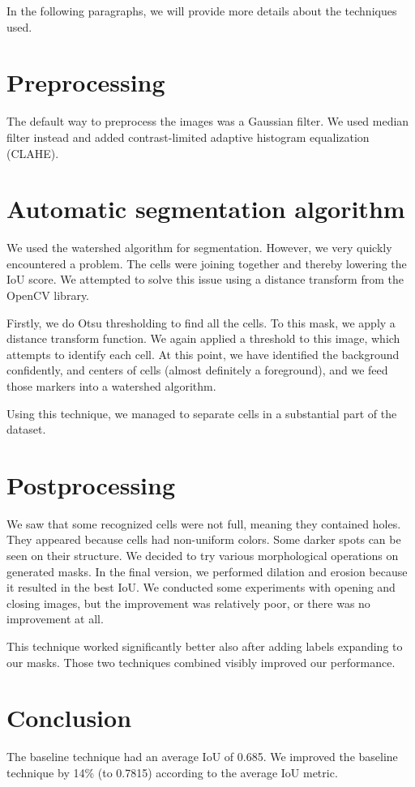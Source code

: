 \documentclass{article}
\begin{document}
In the following paragraphs, we will provide more details about the techniques used.

\section{Preprocessing}

The default way to preprocess the images was a Gaussian filter. We used median filter instead and added contrast-limited adaptive histogram equalization (CLAHE).

\section{Automatic segmentation algorithm}
We used the watershed algorithm for segmentation. However, we very quickly encountered a problem. The cells were joining together and thereby lowering the IoU score. We attempted to solve this issue using a distance transform from the OpenCV library.

Firstly, we do Otsu thresholding to find all the cells. To this mask, we apply a distance transform function. We again applied a threshold to this image, which attempts to identify each cell. At this point, we have identified the background confidently, and centers of cells (almost definitely a foreground), and we feed those markers into a watershed algorithm.

Using this technique, we managed to separate cells in a substantial part of the dataset.


\section{Postprocessing}
We saw that some recognized cells were not full, meaning they contained holes. They appeared because cells had non-uniform colors. Some darker spots can be seen on their structure. We decided to try various morphological operations on generated masks. In the final version, we performed dilation and erosion because it resulted in the best IoU. We conducted some experiments with opening and closing images, but the improvement was relatively poor, or there was no improvement at all.

This technique worked significantly better also after adding labels expanding to our masks. Those two techniques combined visibly improved our performance.

\section{Conclusion}
The baseline technique had an average IoU of 0.685. We improved the baseline technique by 14\% (to 0.7815) according to the average IoU metric.
\end{document}
